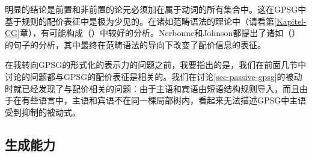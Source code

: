 \zl
明显的结论是前置和非前置的论元必须加在属于动词的所有集合中。这在GPSG中基于规则的配价表征中是极为少见的。在诸如范畴语法的理论中（请看第\ref{Kapitel-CG}章），有可能构成（）中较好的分析\citep{Geach70a}。Nerbonne和Johnson都提出了诸如（）的句子的分析，其中最终在范畴语法的导向下改变了配价信息的表征。

在我转向GPSG的形式化的表示力的问题之前，我要指出的是，我们在前面几节中讨论的问题都与GPSG的配价表征是相关的。我们在讨论\ref{sec-passive-gpsg}的被动时就已经发现了与配价相关的问题：由于主语和宾语由短语结构规则导入，而且由于在有些语言中，主语和宾语不在同一棵局部树内，看起来无法描述GPSG中主语受到抑制的被动式。

\subsection{生成能力}

